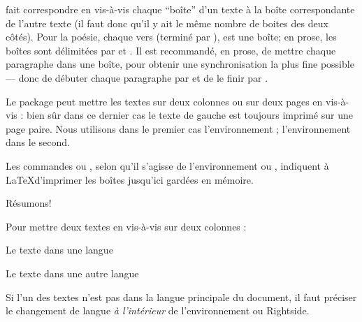  fait correspondre en vis-à-vis chaque \enquote{boîte} d'un texte à la boîte correspondante de l'autre texte (il faut donc qu'il y ait le même nombre de boites des deux côtés). Pour la poésie,  chaque vers  (terminé par \ampersand ), est une boîte;  en prose, les boîtes sont délimitées par   et  .  Il est recommandé, en prose, de mettre chaque paragraphe dans une boîte, pour obtenir une synchronisation la plus fine possible --- donc de débuter chaque paragraphe par  et de le finir par . 


Le package  peut mettre les textes sur deux colonnes ou sur deux pages en vis-à-vis : bien sûr dans ce dernier  cas le texte de gauche est toujours imprimé sur une page paire.
Nous utilisons dans le premier cas l'environnement  ; l'environnement  dans le second.

Les commandes  ou , selon qu'il s'agisse de l'environnement  ou , indiquent à \LaTeX  d'imprimer les boîtes jusqu'ici gardées en mémoire. 



Résumons!

Pour mettre deux textes en vis-à-vis sur deux colonnes :

\begin{latexcode}

\begin{pages}  %
\begin{Leftside} %
\beginnumbering %
\pstart %
 
Le texte dans une langue 
 
\pend
\endnumbering  %
\end{Leftside} %
 
\begin{Rightside}  %
\beginnumbering
\pstart
 
Le texte dans une autre langue
 
\pend
\endnumbering
\end{Rightside} 
\Pages

\end{pages} %
\end{latexcode}

\begin{attention}
Si l'un des textes n'est pas dans la langue principale du document, il faut préciser le changement de langue \emph{à l'intérieur} de l'environnement  ou {Rightside}.

\begin{latexcode}
\begin{Leftside}
\begin{<langue>}
\end{<langue>}
\end{Leftside}
\end{latexcode}
\end{attention}

